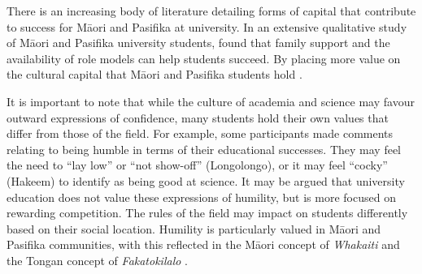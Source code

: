 There is an increasing body of literature detailing forms of capital that contribute to success for M\={a}ori and Pasifika at university. In an extensive qualitative study of M\={a}ori and Pasifika university students, \citep{mayeda2014you} found that family support and the availability of role models can help students succeed. By placing more value on the cultural capital that M\={a}ori and Pasifika students hold \cite{bishop2009te}.

It is important to note that while the culture of academia and science may favour outward expressions of confidence, many students hold their own values that differ from those of the field. For example, some participants made comments relating to being humble in terms of their educational successes. They may feel the need to ``lay low'' or ``not show-off'' (Longolongo), or it may feel ``cocky'' (Hakeem) to identify as being good at science. It may be argued that university education does not value these expressions of humility, but is more focused on rewarding competition. The rules of the field may impact on students differently based on their social location. Humility is particularly valued in M\={a}ori and Pasifika communities, with this reflected in the M\={a}ori concept of \textit{Whakaiti} \cite{haar2018indigenous} and the Tongan concept of \textit{Fakatokilalo} \cite{mafile2004exploring}. 



